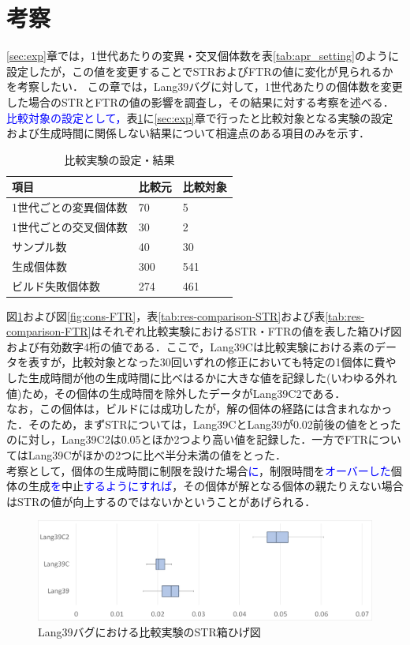 \documentclass[uplatex,dvipdfmx,a4paper]{jsarticle}
\newcommand{\modified}[1]{{\textcolor{blue}{#1}}}
\begin{document}
\section{考察}\label{sec:cons}
\ref{sec:exp}章では，1世代あたりの変異・交叉個体数を表\ref{tab:apr_setting}のように設定したが，この値を変更することでSTRおよびFTRの値に変化が見られるかを考察したい．
この章では，Lang39バグに対して，1世代あたりの個体数を変更した場合のSTRとFTRの値の影響を調査し，その結果に対する考察を述べる．\modified{比較対象の設定として，}表\ref{tab:comparison}に\ref{sec:exp}章で行ったと比較対象となる実験の設定および生成時間に関係しない結果について相違点のある項目のみを示す．
\begin{table}[b]
  \centering
  \caption{比較実験の設定・結果}
  \label{tab:comparison}
  \begin{tabular}{l|ll} \hline\hline
    項目 & 比較元         & 比較対象                           \\\hline
    1世代ごとの変異個体数 & 70 & 5 \\
    1世代ごとの交叉個体数 & 30 & 2 \\
    サンプル数 & 40 & 30 \\
    生成個体数 & 300 & 541 \\
    ビルド失敗個体数 & 274 & 461 \\\hline\hline
  \end{tabular}
\end{table}
図\ref{fig:cons-STR}および図\ref{fig:cons-FTR}，表\ref{tab:res-comparison-STR}および表\ref{tab:res-comparison-FTR}はそれぞれ比較実験におけるSTR・FTRの値を表した箱ひげ図および有効数字4桁の値である．ここで，Lang39Cは比較実験における素のデータを表すが，比較対象となった30回いずれの修正においても特定の1個体に費やした生成時間が他の生成時間に比べはるかに大きな値を記録した(いわゆる外れ値)ため，その個体の生成時間を除外したデータがLang39C2である．\\
なお，この個体は，ビルドには成功したが，解の個体の経路には含まれなかった．そのため，まずSTRについては，Lang39CとLang39が0.02前後の値をとったのに対し，Lang39C2は0.05とほか2つより高い値を記録した．一方でFTRについてはLang39Cがほかの2つに比べ半分未満の値をとった．\\
考察として，個体の生成時間に制限を設けた場合\modified{に}，制限時間を\modified{オーバーした}個体の生成\modified{を}中止\modified{するようにすれば}，その個体が解となる個体の親たりえない場合はSTRの値が向上するのではないかということがあげられる．
\begin{figure}[t]
  \centering
  \includegraphics[width=\linewidth]{fig/cons_STR.png}
  \caption{Lang39バグにおける比較実験のSTR箱ひげ図}
  \label{fig:cons-STR}
\end{figure}
\end{document}
